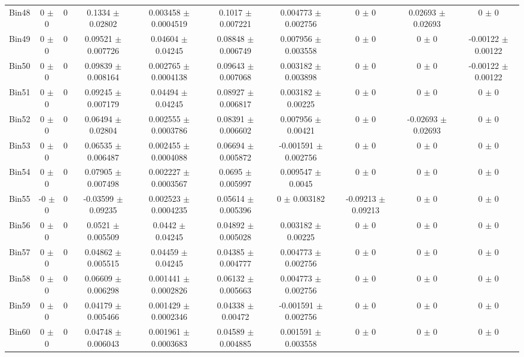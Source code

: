 \begin{tabular}{@{\extracolsep{4pt}}lccccccccc@{}}
     Bin48 & 0 $\pm$ 0 & 0 & 0.1334 $\pm$ 0.02802 & 0.003458 $\pm$ 0.0004519 & 0.1017 $\pm$ 0.007221 & 0.004773 $\pm$ 0.002756 & 0 $\pm$ 0 & 0.02693 $\pm$ 0.02693 & 0 $\pm$ 0 \\ 
     Bin49 & 0 $\pm$ 0 & 0 & 0.09521 $\pm$ 0.007726 & 0.04604 $\pm$ 0.04245 & 0.08848 $\pm$ 0.006749 & 0.007956 $\pm$ 0.003558 & 0 $\pm$ 0 & 0 $\pm$ 0 & -0.00122 $\pm$ 0.00122 \\ 
     Bin50 & 0 $\pm$ 0 & 0 & 0.09839 $\pm$ 0.008164 & 0.002765 $\pm$ 0.0004138 & 0.09643 $\pm$ 0.007068 & 0.003182 $\pm$ 0.003898 & 0 $\pm$ 0 & 0 $\pm$ 0 & -0.00122 $\pm$ 0.00122 \\ 
     Bin51 & 0 $\pm$ 0 & 0 & 0.09245 $\pm$ 0.007179 & 0.04494 $\pm$ 0.04245 & 0.08927 $\pm$ 0.006817 & 0.003182 $\pm$ 0.00225 & 0 $\pm$ 0 & 0 $\pm$ 0 & 0 $\pm$ 0 \\ 
     Bin52 & 0 $\pm$ 0 & 0 & 0.06494 $\pm$ 0.02804 & 0.002555 $\pm$ 0.0003786 & 0.08391 $\pm$ 0.006602 & 0.007956 $\pm$ 0.00421 & 0 $\pm$ 0 & -0.02693 $\pm$ 0.02693 & 0 $\pm$ 0 \\ 
     Bin53 & 0 $\pm$ 0 & 0 & 0.06535 $\pm$ 0.006487 & 0.002455 $\pm$ 0.0004088 & 0.06694 $\pm$ 0.005872 & -0.001591 $\pm$ 0.002756 & 0 $\pm$ 0 & 0 $\pm$ 0 & 0 $\pm$ 0 \\ 
     Bin54 & 0 $\pm$ 0 & 0 & 0.07905 $\pm$ 0.007498 & 0.002227 $\pm$ 0.0003567 & 0.0695 $\pm$ 0.005997 & 0.009547 $\pm$ 0.0045 & 0 $\pm$ 0 & 0 $\pm$ 0 & 0 $\pm$ 0 \\ 
     Bin55 & -0 $\pm$ 0 & 0 & -0.03599 $\pm$ 0.09235 & 0.002523 $\pm$ 0.0004235 & 0.05614 $\pm$ 0.005396 & 0 $\pm$ 0.003182 & -0.09213 $\pm$ 0.09213 & 0 $\pm$ 0 & 0 $\pm$ 0 \\ 
     Bin56 & 0 $\pm$ 0 & 0 & 0.0521 $\pm$ 0.005509 & 0.0442 $\pm$ 0.04245 & 0.04892 $\pm$ 0.005028 & 0.003182 $\pm$ 0.00225 & 0 $\pm$ 0 & 0 $\pm$ 0 & 0 $\pm$ 0 \\ 
     Bin57 & 0 $\pm$ 0 & 0 & 0.04862 $\pm$ 0.005515 & 0.04459 $\pm$ 0.04245 & 0.04385 $\pm$ 0.004777 & 0.004773 $\pm$ 0.002756 & 0 $\pm$ 0 & 0 $\pm$ 0 & 0 $\pm$ 0 \\ 
     Bin58 & 0 $\pm$ 0 & 0 & 0.06609 $\pm$ 0.006298 & 0.001441 $\pm$ 0.0002826 & 0.06132 $\pm$ 0.005663 & 0.004773 $\pm$ 0.002756 & 0 $\pm$ 0 & 0 $\pm$ 0 & 0 $\pm$ 0 \\ 
     Bin59 & 0 $\pm$ 0 & 0 & 0.04179 $\pm$ 0.005466 & 0.001429 $\pm$ 0.0002346 & 0.04338 $\pm$ 0.00472 & -0.001591 $\pm$ 0.002756 & 0 $\pm$ 0 & 0 $\pm$ 0 & 0 $\pm$ 0 \\ 
     Bin60 & 0 $\pm$ 0 & 0 & 0.04748 $\pm$ 0.006043 & 0.001961 $\pm$ 0.0003683 & 0.04589 $\pm$ 0.004885 & 0.001591 $\pm$ 0.003558 & 0 $\pm$ 0 & 0 $\pm$ 0 & 0 $\pm$ 0 \\ 
\hline\hline
  \end{tabular}
